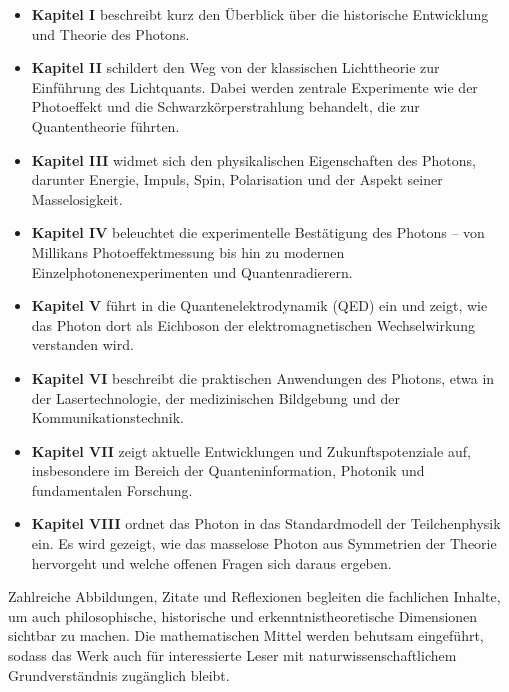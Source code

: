 \begin{itemize}
	\item \textbf{Kapitel I} beschreibt kurz den Überblick über die historische Entwicklung  und Theorie des Photons.
	\item \textbf{Kapitel II} schildert den Weg von der klassischen Lichttheorie zur Einführung des Lichtquants. Dabei werden zentrale Experimente wie der Photoeffekt und die Schwarzkörperstrahlung behandelt, die zur Quantentheorie führten.
	
	\item \textbf{Kapitel III} widmet sich den physikalischen Eigenschaften des Photons, darunter Energie, Impuls, Spin, Polarisation und der Aspekt seiner Masselosigkeit.
	
	\item \textbf{Kapitel IV} beleuchtet die experimentelle Bestätigung des Photons – von Millikans Photoeffektmessung bis hin zu modernen Einzelphotonenexperimenten und Quantenradierern.
	
	\item \textbf{Kapitel V} führt in die Quantenelektrodynamik (QED) ein und zeigt, wie das Photon dort als Eichboson der elektromagnetischen Wechselwirkung verstanden wird.
	
	\item \textbf{Kapitel VI} beschreibt die praktischen Anwendungen des Photons, etwa in der Lasertechnologie, der medizinischen Bildgebung und der Kommunikationstechnik.
	
	\item \textbf{Kapitel VII} zeigt aktuelle Entwicklungen und Zukunftspotenziale auf, insbesondere im Bereich der Quanteninformation, Photonik und fundamentalen Forschung.
	
	\item \textbf{Kapitel VIII} ordnet das Photon in das Standardmodell der Teilchenphysik ein. Es wird gezeigt, wie das masselose Photon aus Symmetrien der Theorie hervorgeht und welche offenen Fragen sich daraus ergeben.
\end{itemize}
Zahlreiche Abbildungen, Zitate und Reflexionen begleiten die fachlichen Inhalte, um auch philosophische, historische und erkenntnistheoretische Dimensionen sichtbar zu machen. Die mathematischen Mittel werden behutsam eingeführt, sodass das Werk auch für interessierte Leser mit naturwissenschaftlichem Grundverständnis zugänglich bleibt.

